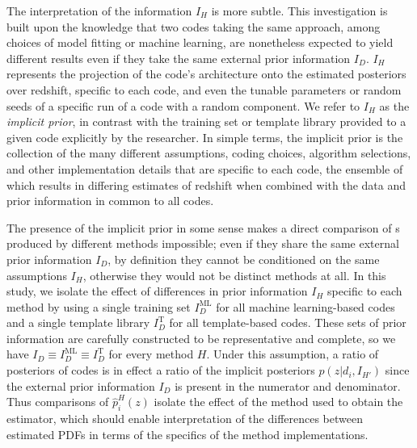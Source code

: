 The interpretation of the information $I_{H}$ is more subtle.
This investigation is built upon the knowledge that two codes taking the same approach, among choices of model fitting or machine learning, are nonetheless expected to yield different results even if they take the same external prior information $I_{D}$.
$I_{H}$ represents the projection of the code's architecture onto the estimated posteriors over redshift, specific to each code, and even the tunable parameters or random seeds of a specific run of a code with a random component.
We refer to $I_{H}$ as the \textit{implicit prior}, in contrast with the training set or template library provided to a given code explicitly by the researcher.  In simple terms, the implicit prior is the collection of the many different assumptions, coding choices, algorithm selections, and other implementation details that are specific to each code, the ensemble of which results in differing estimates of redshift when combined with the data and prior information in common to all codes.

The presence of the implicit prior in some sense makes a direct comparison of \pzpdf s produced by different methods impossible; even if they share the same external prior information $I_{D}$, by definition they cannot be conditioned on the same assumptions $I_{H}$, otherwise they would not be distinct methods at all.
In this study, we isolate the effect of differences in prior information $I_{H}$ specific to each method by using a single training set $I_{D}^{\mathrm{ML}}$ for all machine learning-based codes and a single template library $I_{D}^{\mathrm{T}}$ for all template-based codes.
These sets of prior information are carefully constructed to be representative and complete, so we have $I_{D} \equiv I_{D}^{\mathrm{ML}} \equiv I_{D}^{\mathrm{T}}$ for every method $H$.
Under this assumption, a ratio of posteriors of codes is in effect a ratio of the implicit posteriors $p(z \vert d_{i}, I_{H'})$ since the external prior information $I_{D}$ is present in the numerator and denominator.
Thus comparisons of $\hat{p}_{i}^{H}(z)$ isolate the effect of the method used to obtain the estimator, which should enable interpretation of the differences between estimated PDFs in terms of the specifics of the method implementations.

